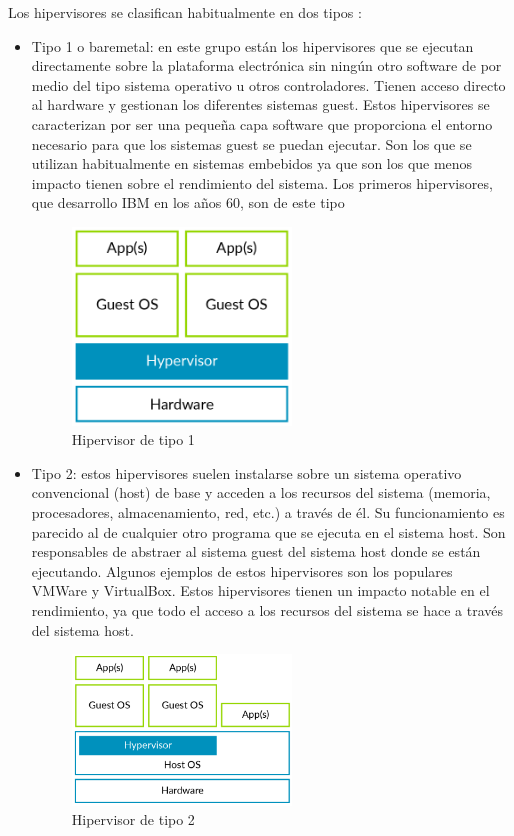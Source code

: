 Los hipervisores se clasifican habitualmente en dos tipos \cite{Popek1974}\cite{hyper_review}:
\begin{itemize}
\item Tipo 1 o baremetal: en este grupo están los hipervisores que se ejecutan directamente sobre
la plataforma electrónica sin ningún otro software de por medio del tipo sistema operativo u
otros controladores. Tienen acceso directo al hardware y gestionan los diferentes sistemas guest. Estos hipervisores se caracterizan por ser una pequeña capa software que proporciona el entorno necesario para que los sistemas guest se puedan ejecutar. Son los que se utilizan habitualmente en sistemas embebidos ya que son los que menos impacto tienen sobre el rendimiento del sistema. Los primeros hipervisores, que desarrollo IBM en los años 60, son de este tipo \cite{hyper_review}\\
\begin{figure}[h]
	\centering
	\includegraphics[width=0.55\textwidth]{recursos/type1_hyp.png}
	\caption{Hipervisor de tipo 1}
	\label{fig:hyper_type1}
\end{figure}
\item Tipo 2: estos hipervisores suelen instalarse sobre un sistema operativo convencional (host) de base y
acceden a los recursos del sistema (memoria, procesadores, almacenamiento, red, etc.) a
través de él. Su funcionamiento es parecido al de cualquier otro programa que se ejecuta en el sistema host. Son responsables de abstraer al sistema guest del sistema host donde se están ejecutando. Algunos ejemplos de estos hipervisores son los populares VMWare y VirtualBox. Estos hipervisores tienen un impacto notable en el rendimiento, ya que todo el acceso a los recursos del sistema se hace a través del sistema host.
\begin{figure}[h]
	\centering
	\includegraphics[width=0.55\textwidth]{recursos/type2_hyp.png}
	\caption{Hipervisor de tipo 2}
	\label{fig:hyper_type2}
\end{figure}
\\
\end{itemize}

